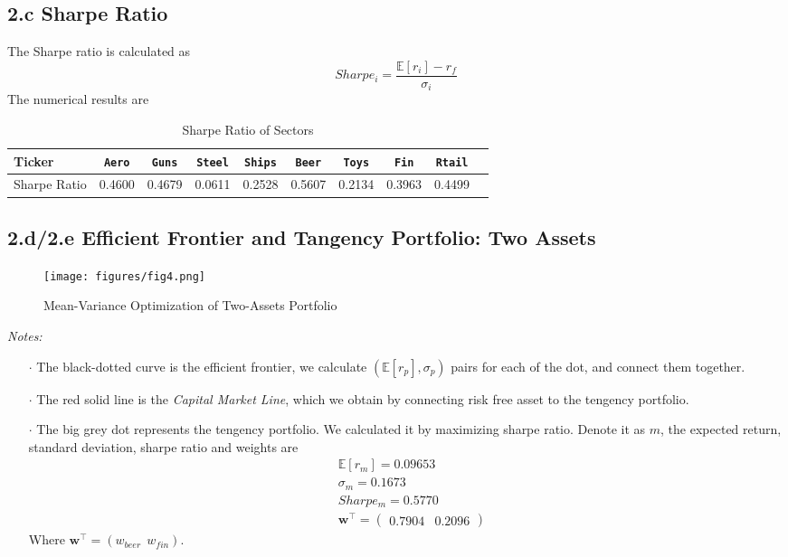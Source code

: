 \documentclass[10 pt]{hwtemplate} %
\begin{document}
\subsection*{2.c Sharpe Ratio}
The Sharpe ratio is calculated as
\begin{equation}
  Sharpe_i = \frac{\mathbb{E}\left[r_i\right]-r_f}{\sigma_i}
\end{equation}
The numerical results are
\begin{table}[htbp]
  \begin{center}
  \captionsetup{justification=centering}
  \caption{\label{tab:sharpe}Sharpe Ratio of Sectors}
  \small
    \begin{tabular}{lccccccccc}
    \toprule
      Ticker & \texttt{Aero} & \texttt{Guns} & \texttt{Steel}& \texttt{Ships}& \texttt{Beer}& \texttt{Toys}& \texttt{Fin}&  \texttt{Rtail}\\
      \midrule
      Sharpe Ratio &0.4600 &
      0.4679 &
      0.0611 &
      0.2528 &
      0.5607 &
      0.2134 &
      0.3963 &
      0.4499 \\
    \bottomrule
    \end{tabular}
  \end{center}
\end{table}

\subsection*{2.d/2.e Efficient Frontier and Tangency Portfolio: Two Assets}
\begin{figure}[H]
  \centering
  \captionsetup{justification=centering}
  \caption{\label{fig:meanvar2}Mean-Variance Optimization of Two-Assets Portfolio}
  \vspace{-10pt}
  \texttt{[image: figures/fig4.png]}
\end{figure}
\textit{Notes: }
\begin{itemize}
  \item[$\cdot$] The black-dotted curve is the efficient frontier, we calculate $(\mathbb{E}\left[r_p\right], \sigma_p)$ pairs for each of the dot, and connect them together.
  \item[$\cdot$] The red solid line is the \textit{Capital Market Line}, which we obtain by connecting risk free asset to the tengency portfolio.
  \item[$\cdot$] The big grey dot represents the tengency portfolio. We calculated it by maximizing sharpe ratio. Denote it as $m$, the expected return, standard deviation, sharpe ratio and weights are
  \begin{equation}
    \begin{split}
      &\mathbb{E}\left[r_m\right] = 0.09653\\
      &\sigma_m = 0.1673\\
      &Sharpe_m = 0.5770 \\
      &\bm{w}^{\top} = \begin{pmatrix}
        0.7904 & 0.2096
      \end{pmatrix}
    \end{split}
  \end{equation}
  Where $\bm{w}^{\top} = (w_{beer}~~w_{fin})$.
\end{itemize}
\end{document}
